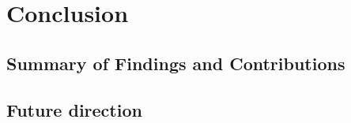 \chapter{Conclusion}

\section{Summary of Findings and Contributions} 


\section{Future direction} 

